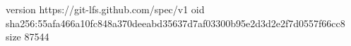 version https://git-lfs.github.com/spec/v1
oid sha256:55afa466a10fc848a370deeabd35637d7af03300b95e2d3d2e2f7d0557f66cc8
size 87544
